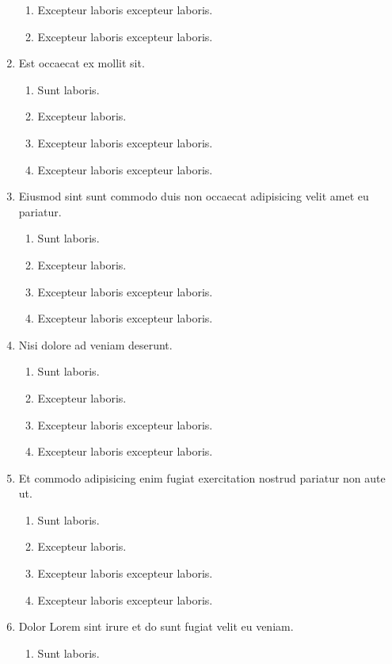 \documentclass[a4paper,12pt]{article}
\begin{document}
\begin{enumerate}[label=\textbf{\arabic*.}]
\begin{enumerate}
    \item Excepteur laboris excepteur laboris.
    \item Excepteur laboris excepteur laboris.
  \end{enumerate}
  \item Est occaecat ex mollit sit.
  \begin{enumerate}
    \item Sunt laboris.
    \item Excepteur laboris.
    \item Excepteur laboris excepteur laboris.
    \item Excepteur laboris excepteur laboris.
  \end{enumerate}
  \item Eiusmod sint sunt commodo duis non occaecat adipisicing velit amet eu pariatur.
  \begin{enumerate}
    \item Sunt laboris.
    \item Excepteur laboris.
    \item Excepteur laboris excepteur laboris.
    \item Excepteur laboris excepteur laboris.
  \end{enumerate}
  \item Nisi dolore ad veniam deserunt.
  \begin{enumerate}
    \item Sunt laboris.
    \item Excepteur laboris.
    \item Excepteur laboris excepteur laboris.
    \item Excepteur laboris excepteur laboris.
  \end{enumerate}
  \item Et commodo adipisicing enim fugiat exercitation nostrud pariatur non aute ut.
  \begin{enumerate}
    \item Sunt laboris.
    \item Excepteur laboris.
    \item Excepteur laboris excepteur laboris.
    \item Excepteur laboris excepteur laboris.
  \end{enumerate}
  \item Dolor Lorem sint irure et do sunt fugiat velit eu veniam.
  \begin{enumerate}
    \item Sunt laboris.

\end{enumerate}
\end{enumerate}
\end{document}
